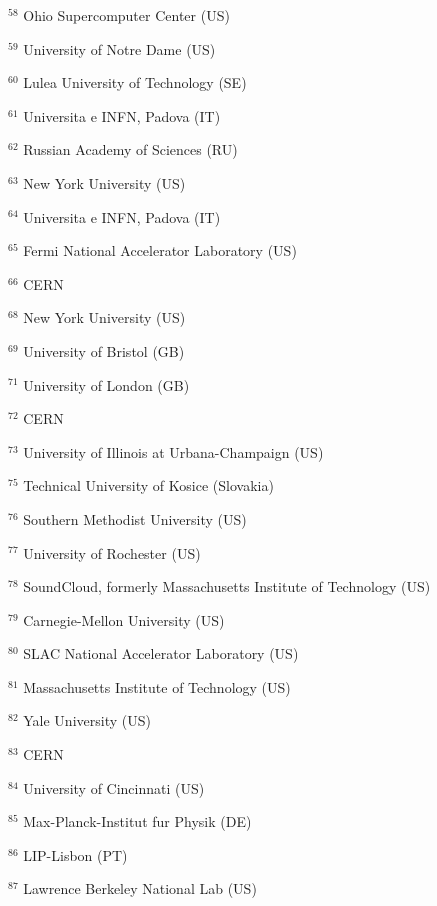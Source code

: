 \par {\footnotesize $^{58}$ Ohio Supercomputer Center (US)}
\par {\footnotesize $^{59}$ University of Notre Dame (US)}
\par {\footnotesize $^{60}$ Lulea University of Technology (SE)}
\par {\footnotesize $^{61}$ Universita e INFN, Padova (IT)}
\par {\footnotesize $^{62}$ Russian Academy of Sciences (RU)}
\par {\footnotesize $^{63}$ New York University (US)}
\par {\footnotesize $^{64}$ Universita e INFN, Padova (IT)}
\par {\footnotesize $^{65}$ Fermi National Accelerator Laboratory (US)}
\par {\footnotesize $^{66}$ CERN}
\par {\footnotesize $^{68}$ New York University (US)}
\par {\footnotesize $^{69}$ University of Bristol (GB)}
\par {\footnotesize $^{71}$ University of London (GB)}
\par {\footnotesize $^{72}$ CERN}
\par {\footnotesize $^{73}$ University of Illinois at Urbana-Champaign (US)}
\par {\footnotesize $^{75}$ Technical University of Kosice (Slovakia)}
\par {\footnotesize $^{76}$ Southern Methodist University (US)}
\par {\footnotesize $^{77}$  University of Rochester (US)}
\par {\footnotesize $^{78}$ SoundCloud, formerly Massachusetts Institute of Technology (US)}
\par {\footnotesize $^{79}$ Carnegie-Mellon University (US)}
\par {\footnotesize $^{80}$ SLAC National Accelerator Laboratory (US)}
\par {\footnotesize $^{81}$ Massachusetts Institute of Technology (US)}
\par {\footnotesize $^{82}$ Yale University (US)}
\par {\footnotesize $^{83}$ CERN}
\par {\footnotesize $^{84}$ University of Cincinnati (US)}
\par {\footnotesize $^{85}$ Max-Planck-Institut fur Physik (DE)}
\par {\footnotesize $^{86}$ LIP-Lisbon (PT)}
\par {\footnotesize $^{87}$ Lawrence Berkeley National Lab (US)}
